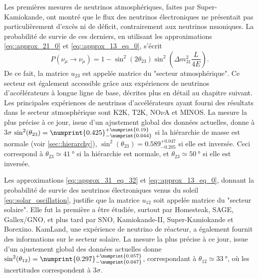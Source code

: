 		    Les premières mesures de neutrinos atmosphériques, faites par Super-Kamiokande\cite{Fukuda1998}, ont montré que le flux des neutrinos électroniques ne présentait pas particulièrement d'excès ni de déficit, contrairement aux neutrinos muoniques. La probabilité de survie de ces derniers, en utilisant les approximations \eqref{eq::approx_21_0} et \eqref{eq::approx_13_eq_0}, s'écrit
		    \begin{equation}\label{eq::mu_approx_atmo}
		    P(\nu_{\mu}\to\nu_{\mu}) = 1 - \sin^2(2\theta_{23})\sin^2\left(\Delta m^2_{31}\frac{L}{4E}\right).
		    \end{equation}
		    De ce fait, la matrice $u_{23}$ est appelée matrice du "secteur atmosphérique". Ce secteur est également accessible grâce aux expériences de neutrinos d'accélérateurs à longue ligne de base, décrites plus en détail au chapitre suivant. Les principales expériences de neutrinos d'accélérateurs ayant fourni des résultats dans le secteur atmosphérique sont K2K\cite{Collaboration2006a}, T2K\cite{Abe2018}, NO$\nu$A\cite{Adamson2016} et MINOS\cite{Collaboration2014}. La mesure la plus précise à ce jour, issue d'un ajustement global des données actuelles, donne à $3\sigma$ $\sin^2(\theta_{23})=\numprint{0.425}^{+\numprint{0.19}}_{-\numprint{0.044}}$\cite{pdg2018} si la hiérarchie de masse est normale (voir \autoref{sec::hierarchy}), $\sin^2(\theta_{23})=0.589^{+0.047}_{-0.205}$ si elle est inversée. Ceci correspond à $\theta_{23}\simeq\SI{41}{\degree}$ si la hiérarchie est normale, et $\theta_{23}\simeq\SI{50}{\degree}$ si elle est inversée.
		    
		    Les approximations \eqref{eq::approx_31_eq_32} et \eqref{eq::approx_13_eq_0}, donnant la probabilité de survie des neutrinos électroniques venus du soleil \eqref{eq::solar_oscillation}, justifie que la matrice $u_{12}$ soit appelée matrice du "secteur solaire". Elle fut la première a être étudiée, surtout par Homesteak\cite{Lande1990}, SAGE\cite{Collaboration2009}, Gallex/GNO\cite{Hampel1999}, et plus tard par SNO\cite{Aharmim2013},  Kamiokande-II\cite{Hirata1992}, Super-Kamiokande\cite{Abe2018} et Borexino\cite{Collaboration2013}. KamLand\cite{Collaboration2004}, une expérience de neutrino de réacteur, a également fournit des informations sur le secteur solaire. La mesure la plus précise à ce jour, issue d'un ajustement global des données actuelles donne $\sin^2(\theta_{12})=\numprint{0.297}^{+\numprint{0.057}}_{-\numprint{0.047}}$\cite{pdg2018}, correspondant à $\theta_{12}\simeq\SI{33}{\degree}$, où les incertitudes correspondent à $3\sigma$.
		    
